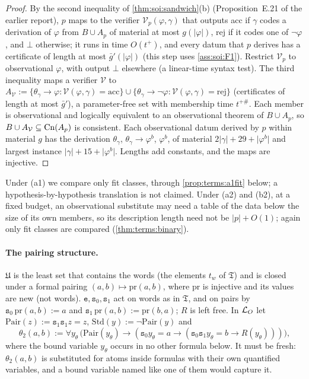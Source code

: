 \begin{proof}
By the second inequality of \cref{thm:soi:sandwich}(b) (Proposition~E.21 of the earlier report), $p$ maps to the verifier $\mathcal V_p(\varphi,\gamma)$ that outputs acc if $\gamma$ codes a derivation of $\varphi$ from $B\cup A_p$ of material at most $g(\lvert\varphi\rvert)$, rej if it codes one of $\neg\varphi$, and $\bot$ otherwise; it runs in time $O(t^+)$, and every datum that $p$ derives has a certificate of length at most $\bar g'(\lvert\varphi\rvert)$ (this step uses \cref{ass:soi:F1}). Restrict $\mathcal V_p$ to observational $\varphi$, with output $\bot$ elsewhere (a linear-time syntax test). The third inequality maps a verifier $\mathcal V$ to $A_{\mathcal V}:=\{\theta_\gamma\to\varphi:\mathcal V(\varphi,\gamma)=\mathrm{acc}\}\cup\{\theta_\gamma\to\neg\varphi:\mathcal V(\varphi,\gamma)=\mathrm{rej}\}$ (certificates of length at most $\bar g'$), a parameter-free set with membership time $t^{+\#}$. Each member is observational and logically equivalent to an observational theorem of $B\cup A_p$, so $B\cup A_{\mathcal V}\subseteq\mathrm{Cn}(A_p)$ is consistent. Each observational datum derived by $p$ within material $g$ has the derivation $\theta_\gamma$, $\theta_\gamma\to\varphi^b$, $\varphi^b$, of material $2\lvert\gamma\rvert+29+\lvert\varphi^b\rvert$ and largest instance $\lvert\gamma\rvert+15+\lvert\varphi^b\rvert$. Lengths add constants, and the maps are injective.
\end{proof}

Under (a1) we compare only fit classes, through \cref{prop:terms:a1fit} below; a hypothesis-by-hypothesis translation is not claimed. Under (a2) and (b2), at a fixed budget, an observational substitute may need a table of the data below the size of its own members, so its description length need not be $\lvert p\rvert+O(1)$; again only fit classes are compared (\cref{thm:terms:binary}).

\paragraph{The pairing structure.} $\mathfrak U$ is the least set that contains the words (the elements $t_w$ of $\mathfrak T$) and is closed under a formal pairing $(a,b)\mapsto\mathrm{pr}(a,b)$, where $\mathrm{pr}$ is injective and its values are new (not words). $\mathtt e,\mathtt s_0,\mathtt s_1$ act on words as in $\mathfrak T$, and on pairs by $\mathtt s_0\,\mathrm{pr}(a,b):=a$ and $\mathtt s_1\,\mathrm{pr}(a,b):=\mathrm{pr}(b,a)$; $R$ is left free. In $\mathcal{L}_{O}$ let $\mathrm{Pair}(z):=\mathtt s_1\mathtt s_1z=z$, $\mathrm{Std}(y):=\neg\mathrm{Pair}(y)$ and
\[
\theta_2(a,b):=\forall y_\theta\,\bigl(\mathrm{Pair}(y_\theta)\to(\mathtt s_0y_\theta=a\to(\mathtt s_0\mathtt s_1y_\theta=b\to R(y_\theta)))\bigr),
\]
where the bound variable $y_\theta$ occurs in no other formula below. It must be fresh: $\theta_2(a,b)$ is substituted for atoms inside formulas with their own quantified variables, and a bound variable named like one of them would capture it.

